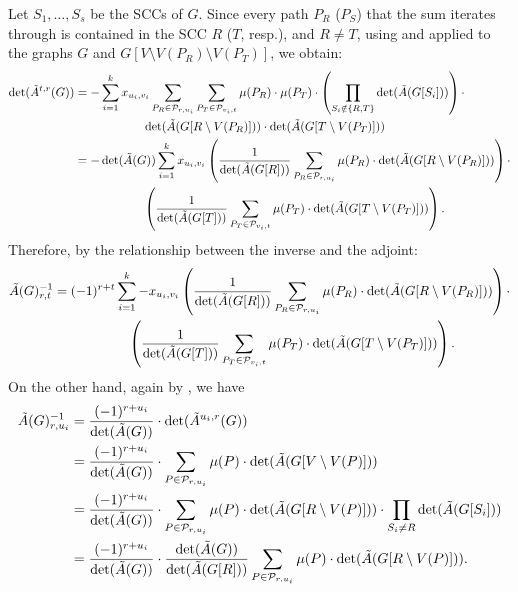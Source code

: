 \documentclass[11pt]{article}
\begin{document}
{Let $S_1,\ldots,S_s$ be the SCCs of $G$. 
Since every path $P_R$ ($P_S$) that the sum iterates through is contained in the SCC $R$ ($T$, resp.), and $R\neq T$,
using  and  applied
to the graphs $G$ and $G[V\setminus V(P_R)\setminus V(P_T)]$, we obtain:
\begin{align*}
  \det(\tilde{A}^{t,r}(G))
  &=-\sum_{i=1}^k x_{u_i,v_i}\sum_{P_R\in \mathcal{P}_{r,u_i}}\sum_{P_T\in \mathcal{P}_{v_i,t}}\mu(P_R)\cdot \mu(P_T)\cdot \left(\prod_{S_i\notin \{R,T\}} \det(\tilde{A}(G[S_i]))\right) \cdot\\
  & \hspace{2cm}\det(\tilde{A}(G[R\setminus V(P_R)])) \cdot \det(\tilde{A}(G[T\setminus V(P_T)]))\\
  &=-\det(\tilde{A}(G))\sum_{i=1}^k x_{u_i,v_i}\left(\frac{1}{\det(\tilde{A}(G[R]))}\sum_{P_R\in \mathcal{P}_{r,u_i}}\mu(P_R)\cdot \det(\tilde{A}(G[R\setminus V(P_R)])) \right)\cdot \\
  &\hspace{2cm}\left(\frac{1}{\det(\tilde{A}(G[T]))}\sum_{P_T\in \mathcal{P}_{v_i,t}}\mu(P_T)\cdot \det(\tilde{A}(G[T\setminus V(P_T)])) \right).
\end{align*}
Therefore, by the relationship between the inverse and the adjoint:
\begin{align}\label{eq:u1v1}
  \begin{split}
  \tilde{A}(G)^{-1}_{r,t}
  &=(-1)^{r+t}\sum_{i=1}^k -x_{u_i,v_i}\left(\frac{1}{\det(\tilde{A}(G[R]))}\sum_{P_R\in \mathcal{P}_{r,u_i}}\mu(P_R)\cdot \det(\tilde{A}(G[R\setminus V(P_R)])) \right)\cdot \\
  &\hspace{2cm}\left(\frac{1}{\det(\tilde{A}(G[T]))}\sum_{P_T\in \mathcal{P}_{v_i,t}}\mu(P_T)\cdot \det(\tilde{A}(G[T\setminus V(P_T)])) \right).
  \end{split}
\end{align}
On the other hand, again by , we have
\begin{align*}
  \asymb(G)^{-1}_{r,u_i}&=\frac{(-1)^{r+u_i}}{\det(\asymb(G))}\cdot \det(\asymb^{u_i,r}(G))\\
  &= \frac{(-1)^{r+u_i}}{\det(\asymb(G))}\cdot\sum_{P\in \mathcal{P}_{r,u_i}} \mu(P)\cdot \det(\asymb(G[V\setminus V(P)]))\\
  &=\frac{(-1)^{r+u_i}}{\det(\asymb(G))}\cdot\sum_{P\in \mathcal{P}_{r,u_i}} \mu(P)\cdot \det(\asymb(G[R\setminus V(P)]))\cdot \prod_{S_i\neq R} \det(\asymb(G[S_i]))\\
  &=\frac{(-1)^{r+u_i}}{\det(\asymb(G))}\cdot \frac{\det(\asymb(G))}{\det(\asymb(G[R]))}\sum_{P\in \mathcal{P}_{r,u_i}} \mu(P)\cdot \det(\asymb(G[R\setminus V(P)])).

\end{align*}}
\end{document}
